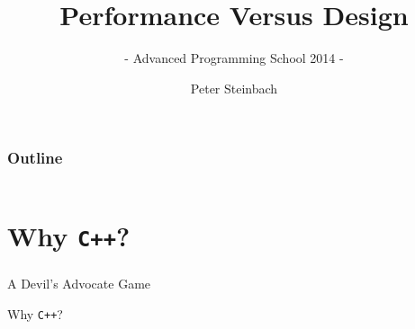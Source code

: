 \documentclass[9pt,xcolor=table]{beamer}
\def\cpp{\texttt{C++}}
\begin{document}
     
 
 
\title[PerfVsDesign]{Performance Versus Design}
\subtitle{- Advanced Programming School 2014 -}
\author[P. Steinbach]{Peter Steinbach}
\date{}
\addtocounter{framenumber}{-1}
\renewcommand*\inserttotalframenumber{XX} 

 
{
\maketitle
}

\begin{frame}[t]
\frametitle{Outline}
\vspace{-1.5\baselineskip}
\begin{columns}[t]
  \begin{column}{.1\textwidth}
    \hfill
  \end{column}
  \begin{column}{.75\textwidth}
    \huge
    \tableofcontents[hideallsubsections]
  \end{column}
  \begin{column}{.1\textwidth}
    \hfill
  \end{column}
\end{columns}
\end{frame}

\section[Why \cpp{}?]{Why \cpp{}?}
\begin{frame}
\frametitle{\insertsection{}}
\begin{block}{A Devil's Advocate Game}
  \Huge
  \begin{center}
    \alert{Why \cpp{}?}
  \end{center}
\end{block}
\end{frame}
\end{document}
